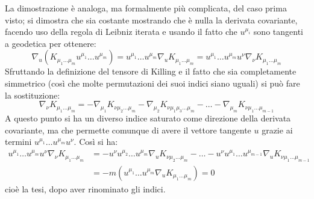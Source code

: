 La dimostrazione è analoga, ma formalmente più complicata, del caso prima visto; si dimostra che sia costante mostrando che è nulla la derivata covariante, facendo uso della regola di Leibniz iterata e usando il fatto che $u^{\mu_i}$ sono tangenti a geodetica per ottenere:
\begin{equation*}
    \nabla_u(  K_{\mu_1\dots\mu_m} u^{\mu_1}\dots u^{\mu_m}) = u^{\mu_1}\dots u^{\mu_m}\nabla_u K_{\mu_1\dots \mu_m} = u^{\mu_1}\dots u^{\mu_m} u^\nu \nabla_\nu K_{\mu_1\dots \mu_m} 
\end{equation*}
Sfruttando la definizione del tensore di Killing e il fatto che sia completamente simmetrico (così che molte permutazioni dei suoi indici siano uguali) si può fare la sostituzione:
\begin{equation*}
    \nabla_\nu K_{\mu_1\dots\mu_m} = - \nabla_{\mu_1} K_{\nu\mu_2\dots \mu_m} - \nabla_{\mu_2} K_{\nu\mu_1\mu_3 \dots \mu_m} - \dots - \nabla_{\mu_m} K_{\nu\mu_1\dots\mu_{m-1}}
\end{equation*}
A questo punto si ha un diverso indice saturato come direzione della derivata covariante, ma che permette comunque di avere il vettore tangente $u$ grazie ai termini $ u^{\mu_1}\dots u^{\mu_m} u^\nu$. Così si ha:
\begin{align*}
    u^{\mu_1}\dots u^{\mu_m} u^\nu \nabla_\nu K_{\mu_1\dots \mu_m} &= - u^\nu u^{\mu_2}\dots u^{\mu_m} \nabla_u K_{\nu\mu_2\dots\mu_m} - \dots - u^\nu u^{\mu_1}\dots u^{\mu_{m-1}} \nabla_u K_{\nu\mu_1\dots\mu_{m-1}} \\
    &= -m( u^{\mu_1} \dots u^{\mu_m} \nabla_u K_{\mu_1\dots\mu_m})= 0
\end{align*}
cioè la tesi, dopo aver rinominato gli indici.

